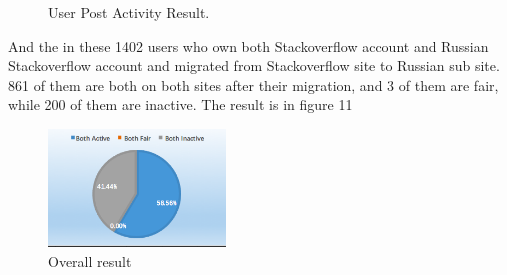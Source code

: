 \documentclass[A4paper,twoside,twocolumn]{article}
\begin{document}
	\begin{figure} [H]
	\centering 
	\caption{ User Post Activity Result. } 
	\label{fig} 
	\end{figure}
And the in these 1402 users who own both Stackoverflow account and Russian Stackoverflow account and migrated from Stackoverflow site to Russian sub site. 861 of them are both on both sites after their migration, and 3 of them are fair, while 200 of them are inactive. The result is in figure 11
	\begin{figure}[H]
		\includegraphics[width = 0.42\textwidth]{useractivity_post2.png}
		\caption{Overall result}
  	\end{figure}
  	
\end{document}
